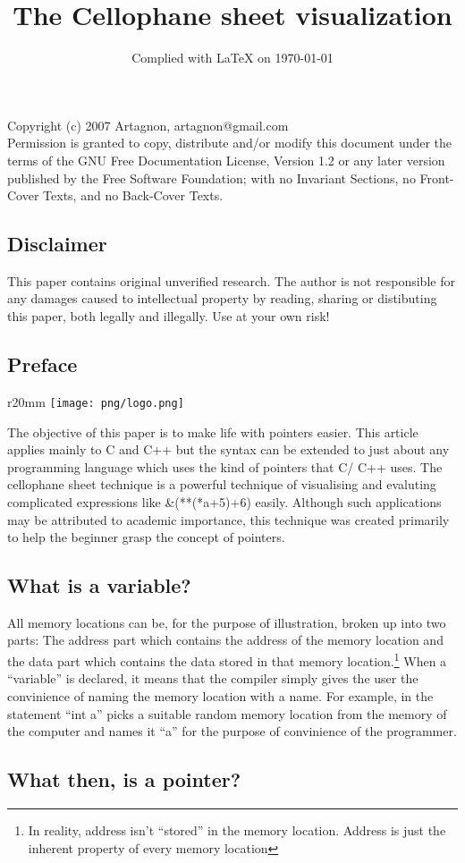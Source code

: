 \documentclass[10pt,twoside]{article}
\begin{document}
\title{The Cellophane sheet visualization}
\date{Complied with \LaTeX{} on \today}
\maketitle
\begin{center}
{\scriptsize Copyright (c) 2007 Artagnon, artagnon@gmail.com\\ Permission is
granted to copy, distribute and/or modify this document under the terms of the
GNU Free Documentation License, Version 1.2 or any later version published by
the Free Software Foundation; with no Invariant Sections, no Front-Cover Texts,
and no Back-Cover Texts.}
\end{center}

\subsection*{Disclaimer}
This paper contains original unverified research. The author is not responsible
for any damages caused to intellectual property by reading, sharing or
distibuting this paper, both legally and illegally. Use at your own risk!

\subsection*{Preface}

\begin{wrapfigure}{r}{20mm}
\texttt{[image: png/logo.png]}
\end{wrapfigure}

The objective of this paper is to make life with pointers easier. This article
applies mainly to C and C++ but the syntax can be extended to just about any
programming language which uses the kind of pointers that C/ C++ uses. The
cellophane sheet technique is a powerful technique of visualising and evaluting
complicated expressions like \&(**(*a+5)+6) easily. Although such applications
may be attributed to academic importance, this technique was created primarily
to help the beginner grasp the concept of pointers.


\subsection*{What is a variable?}
All memory locations can be, for the purpose of illustration, broken up into two
parts: The address part which contains the address of the memory location and
the data part which contains the data stored in that memory
location.\footnote{In reality, address isn't ``stored'' in the memory location.
Address is just the inherent property of every memory location} When a
``variable'' is declared, it means that the compiler simply gives the user the
convinience of naming the memory location with a name. For example, in the
statement ``int a'' picks a suitable random memory location from the memory of
the computer and names it ``a'' for the purpose of convinience of the
programmer.  \newpage \subsection*{What then, is a pointer?}
\end{document}
